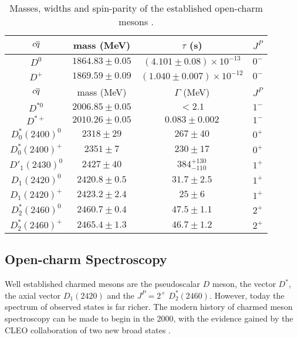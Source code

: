 \begin{table}
  \centering
  \begin{tabular}{c c c c}
    \toprule
    $c \overline{q}$ & mass (MeV) & $\tau$ (s) & $J^P$ \\
    \midrule
    $D^0$ & $1864.83 \pm 0.05 $ & $\left( 4.101 \pm 0.08 \right) \times 10^{-13}$ & $0^-$ \\
    $D^+$ & $1869.59 \pm 0.09$ & $\left( 1.040 \pm 0.007 \right) \times 10^{-12}$ & $0^-$ \\ 
    \midrule[\heavyrulewidth]
    $c \overline{q}$ & mass (MeV) & $\Gamma$ (MeV) & $J^P$ \\ 
    \midrule
    $D^{* 0}$ & $2006.85 \pm 0.05$ & $< 2.1$ & $1^-$ \\
    $D^{* +}$ & $2010.26 \pm 0.05$ & $0.083 \pm 0.002$ & $1^-$ \\
    \addlinespace
    $D_0^*(2400)^0$ & $2318 \pm 29$ & $267 \pm 40$ & $0^+$ \\
    $D_0^*(2400)^+$ & $2351 \pm 7$ & $230 \pm 17$ & $0^+$ \\
    \addlinespace
    $D'_{1}(2430)^0$ & $2427 \pm 40$ & $384^{+130}_{-110}$ & $1^+$ \\
    \addlinespace
    $D_1(2420)^0$ & $2420.8 \pm 0.5$ & $31.7 \pm 2.5$ & $1^+$ \\
    $D_1(2420)^+$ & $2423.2 \pm 2.4$ &  $25 \pm 6$ & $1^+$ \\
    \addlinespace
    $D^*_2(2460)^0$ & $2460.7 \pm 0.4$ & $ 47.5 \pm 1.1$ & $2^+$ \\
    $D^*_2(2460)^+$ & $2465.4 \pm 1.3$ & $46.7 \pm 1.2$ & $2^+$ \\
    \bottomrule
  \end{tabular}
  \caption{Masses, widths and spin-parity of the established open-charm mesons \cite{Patrignani:2016xqp}.}
  \label{tab:D_established}
\end{table}

\subsection{Open-charm Spectroscopy}

Well established charmed mesons are the pseudoscalar $D$ meson, the vector $D^*$, the axial vector $D_1(2420)$ and the $J^P = 2^+$ $D^*_2(2460)$. However, today the spectrum of observed states is far richer. The modern history of charmed meson spectroscopy can be made to begin in the 2000, with the evidence gained by the CLEO collaboration of two new broad states \cite{Anderson:1999wn}. 

